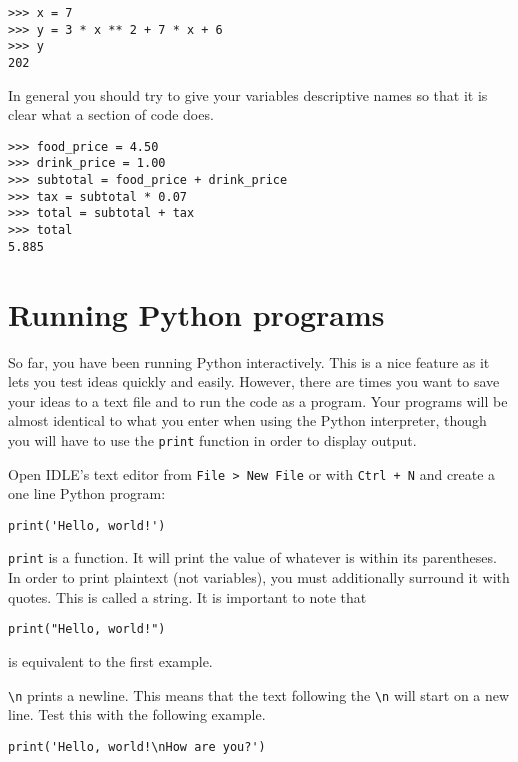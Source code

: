 \documentclass[12pt]{article}
\begin{document}
\begin{lstlisting}[style=bash]
>>> x = 7
>>> y = 3 * x ** 2 + 7 * x + 6
>>> y
202
\end{lstlisting}

In general you should try to give your variables descriptive names so that it is clear what a section of code does.

\begin{lstlisting}[style=bash]
>>> food_price = 4.50
>>> drink_price = 1.00
>>> subtotal = food_price + drink_price
>>> tax = subtotal * 0.07
>>> total = subtotal + tax
>>> total
5.885
\end{lstlisting}

\section{Running Python programs} 

So far, you have been running Python interactively. This is a nice feature as it lets you test ideas quickly and easily. However, there are times you want to save your ideas to a text file and to run the code as a program. Your programs will be almost identical to what you enter when using the Python interpreter, though you will have to use the \texttt{print} function in order to display output.

Open IDLE's text editor from \texttt{File > New File} or with \texttt{Ctrl + N} and create a one line Python program:

\begin{lstlisting}[style=c]
print('Hello, world!')
\end{lstlisting}

\texttt{print} is a function. It will print the value of whatever is within its parentheses. In order to print plaintext (not variables), you must additionally surround it with quotes. This is called a string. It is important to note that

\begin{lstlisting}[style=c]
print("Hello, world!")
\end{lstlisting}

is equivalent to the first example.

\texttt{\textbackslash n} prints a newline. This means that the text following the \texttt{\textbackslash n} will start on a new line. Test this with the following example.

\begin{lstlisting}[style=c]
print('Hello, world!\nHow are you?')
\end{lstlisting}
\end{document}
